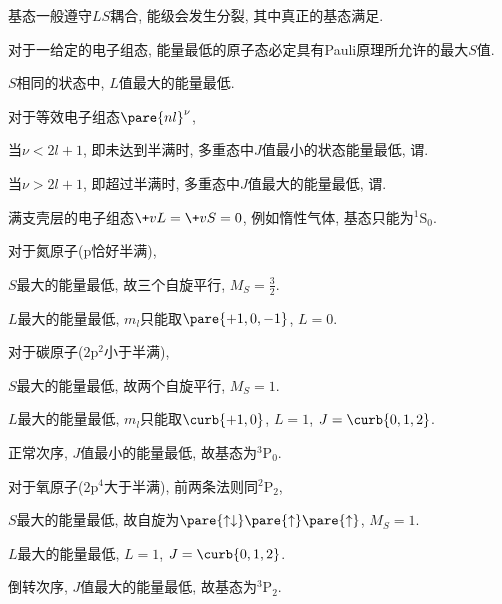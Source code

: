 \documentclass[hidelinks]{ctexart}
\begin{document}
基态一般遵守$LS$耦合, 能级会发生分裂, 其中真正的基态满足.
\begin{resume}
    \begin{cenum}
        \item 对于一给定的电子组态, 能量最低的原子态必定具有Pauli原理所允许的最大$S$值.
        \item $S$相同的状态中, $L$值最大的能量最低.
        \item 对于等效电子组态$\pare{nl}^\nu$,
        \begin{cenum}
            \item 当$\nu<{2l+1}$, 即未达到半满时, 多重态中$J$值最小的状态能量最低, 谓.
            \item 当$\nu>{2l+1}$, 即超过半满时, 多重态中$J$值最大的能量最低, 谓.
        \end{cenum}
    \end{cenum}
\end{resume}
\begin{ex}
    满支壳层的电子组态$\+vL=\+vS=0$, 例如惰性气体, 基态只能为$^1\mathrm{S}_0$.
\end{ex}
\begin{ex}
    对于氮原子($\mathrm{p}$恰好半满),
    \begin{cenum}
        \item $S$最大的能量最低, 故三个自旋平行, $\displaystyle M_S = \frac{3}{2}$.
        \item $L$最大的能量最低, $m_l$只能取$\pare{+1,0,-1}$, $L=0$.
    \end{cenum}
\end{ex}
\begin{ex}
    对于碳原子($2\mathrm{p}^2$小于半满),
    \begin{cenum}
        \item $S$最大的能量最低, 故两个自旋平行, $\displaystyle M_S = 1$.
        \item $L$最大的能量最低, $m_l$只能取$\curb{+1,0}$, $L=1$, $J=\curb{0,1,2}$.
        \item 正常次序, $J$值最小的能量最低, 故基态为$^3\mathrm{P}_0$.
    \end{cenum}
\end{ex}
\begin{ex}
    对于氧原子($2\mathrm{p}^4$大于半满), 前两条法则同$^2\mathrm{P}_2$,
    \begin{cenum}
        \item $S$最大的能量最低, 故自旋为$\pare{\uparrow\downarrow}\pare{\uparrow}\pare{\uparrow}$, $\displaystyle M_S = 1$.
        \item $L$最大的能量最低, $L=1$, $J=\curb{0,1,2}$.
        \item 倒转次序, $J$值最大的能量最低, 故基态为$^3\mathrm{P}_2$.
    \end{cenum}
\end{ex}
\end{document}
